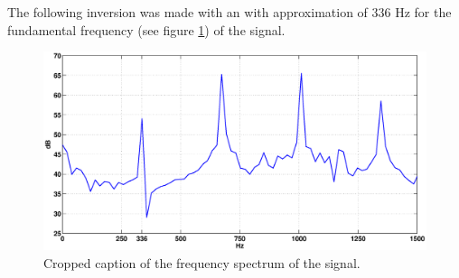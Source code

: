 \documentclass[12pt,a4]{article}
\begin{document}
The following inversion was made with an with approximation of 336 Hz for the fundamental frequency (see figure \ref{fig:roopeHigh}) of the signal.
\begin{figure}[H]
\begin{center}
 \includegraphics[scale=.3]{img/roope_high_spectrum.eps}
 \caption{Cropped caption of the frequency spectrum of the signal.}\label{fig:roopeHigh}
\end{center}
\end{figure}
\end{document}
